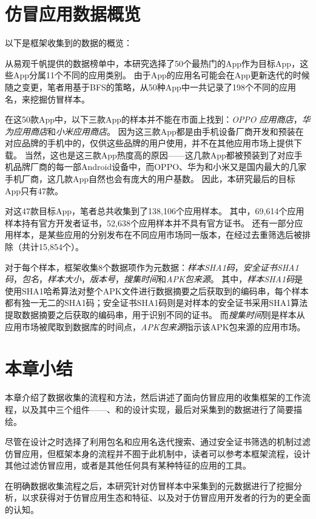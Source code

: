 \section{仿冒应用数据概览}
以下是框架收集到的数据的概览：

从易观千帆提供的数据榜单中，本研究选择了50个最热门的App作为目标App，这些App分属11个不同的应用类别。
由于App的应用名可能会在App更新迭代的时候随之变更，笔者用基于BFS的策略，从50种App中一共记录了198个不同的应用名，来挖掘仿冒样本。

在这50款App中，以下三款App的样本并不能在市面上找到：\emph{OPPO 应用商店}，\emph{华为应用商店}和\emph{小米应用商店}。
因为这三款App都是由手机设备厂商开发和预装在对应品牌的手机中的，仅供这些品牌的用户使用，并不在其他应用市场上提供下载。
当然，这也是这三款App热度高的原因——这几款App都被预装到了对应手机品牌厂商的每一部Android设备中，而OPPO、华为和小米又是国内最大的几家手机厂商，这几款App自然也会有庞大的用户基数。
因此，本研究最后的目标App只有47款。

对这47款目标App，笔者总共收集到了138,106个应用样本。
其中，69,614个应用样本持有官方开发者证书，52,638个应用样本并不具有官方证书。
还有一部分应用样本，是某些应用的分别发布在不同应用市场同一版本，在经过去重筛选后被排除（共计15,854个）。

对于每个样本，框架收集8个数据项作为元数据：\emph{样本SHA1码}，\emph{安全证书SHA1码}，\emph{包名}，\emph{样本大小}，\emph{版本号}，\emph{搜集时间}和\emph{APK包来源}。
其中，\emph{样本SHA1码}是使用SHA1哈希算法对整个APK文件进行数据摘要之后获取到的编码串，每个样本都有独一无二的SHA1码；安全证书SHA1码则是对样本的安全证书采用SHA1算法提取数据摘要之后获取的编码串，用于识别不同的证书。
而\emph{搜集时间}则是样本从应用市场被爬取到数据库的时间点，\emph{APK包来源}指示该APK包来源的应用市场。


\section{本章小结}
本章介绍了数据收集的流程和方法，然后讲述了面向仿冒应用的收集框架\mytool 的工作流程，以及其中三个组件——\componentA 、\componentB 和\componentC 的设计实现，最后对采集到的数据进行了简要描绘。

尽管\mytool 在设计之时选择了利用包名和应用名迭代搜索、通过安全证书筛选的机制过滤仿冒应用，但框架本身的流程并不囿于此机制中，读者可以参考本框架流程，设计其他过滤仿冒应用，或者是其他任何具有某种特征的应用的工具。

在明确数据收集流程之后，本研究针对仿冒样本中采集到的元数据进行了挖掘分析，以求获得对于仿冒应用生态和特征、以及对于仿冒应用开发者的行为的更全面的认知。
